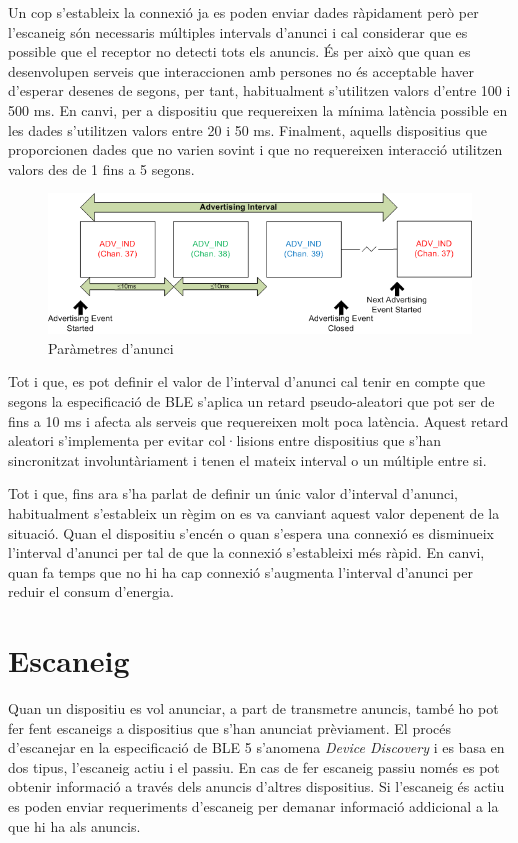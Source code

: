 Un cop s'estableix la connexió ja es poden enviar dades ràpidament però per l'escaneig són necessaris múltiples intervals d'anunci i cal considerar que es possible que el receptor no detecti tots els anuncis. 
És per això que quan es desenvolupen serveis que interaccionen amb persones no és acceptable haver d'esperar desenes de segons, per tant, habitualment s'utilitzen valors d'entre 100 i 500 ms.
En canvi, per a dispositiu que requereixen la mínima latència possible en les dades s'utilitzen valors entre 20 i 50 ms.
Finalment, aquells dispositius que proporcionen dades que no varien sovint i que no requereixen interacció utilitzen valors des de 1 fins a 5 segons.

\begin{figure}[h!]
	\begin{center}
		\includegraphics{./images/advertisement_params.png}
		\caption{Paràmetres d'anunci \cite{advertisment_params}}
		\label{fig:advertisment_params}
	\end{center}
\end{figure}

Tot i que, es pot definir el valor de l'interval d'anunci cal tenir en compte que segons la especificació de BLE s'aplica un retard pseudo-aleatori que pot ser de fins a 10 ms i afecta als serveis que requereixen molt poca latència.
Aquest retard aleatori s'implementa per evitar col·lisions entre dispositius que s'han sincronitzat involuntàriament i tenen el mateix interval o un múltiple entre si.

Tot i que, fins ara s'ha parlat de definir un únic valor d'interval d'anunci, habitualment s'estableix un règim on es va canviant aquest valor depenent de la situació.
Quan el dispositiu s'encén o quan s'espera una connexió es disminueix l'interval d'anunci per tal de que la connexió s'estableixi més ràpid.
En canvi, quan fa temps que no hi ha cap connexió s'augmenta l'interval d'anunci per reduir el consum d'energia. 


\section{Escaneig}
Quan un dispositiu es vol anunciar, a part de transmetre anuncis, també ho pot fer fent escaneigs a dispositius que s'han anunciat prèviament.
El procés d'escanejar en la especificació de BLE 5 s'anomena \textit{Device Discovery} i es basa en dos tipus, l'escaneig actiu i el passiu.
En cas de fer escaneig passiu només es pot obtenir informació a través dels anuncis d'altres dispositius.
Si l'escaneig és actiu es poden enviar requeriments d'escaneig per demanar informació addicional a la que hi ha als anuncis.

